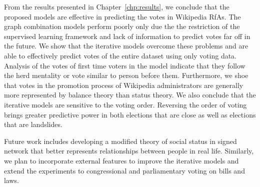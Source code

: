 From the results presented in Chapter~\ref{chp:results}, we conclude that the proposed models are effective in predicting the votes in Wikipedia RfAs.
The graph combination models perform poorly only due the the restriction of the supervised learning framework and lack of information to predict votes far off in the future.
We show that the iterative models overcome these problems and are able to effectively predict votes of the entire dataset using only voting data.
Analysis of the votes of first time voters in the model indicate that they follow the herd mentality or vote similar to person before them.
Furthermore, we shoe that votes in the promotion process of Wikipedia administrators are generally more represented by balance theory than status theory.
We also conclude that the iterative models are sensitive to the voting order.
Reversing the order of voting brings greater predictive power in both elections that are close as well as elections that are landslides.

Future work includes developing a modified theory of social status in signed network that better represents relationships between people in real life. Similarly, we plan to incorporate external features to improve the iterative models and extend the experiments to congressional and parliamentary voting on bills and laws. 

